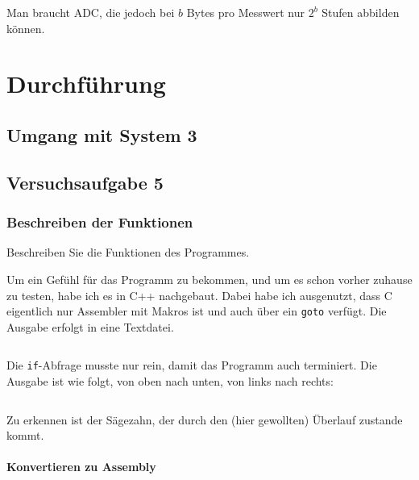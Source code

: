 Man braucht ADC, die jedoch bei $b$ Bytes pro Messwert nur $2^b$ Stufen
abbilden können.


\section{Durchführung}

\subsection{Umgang mit System 3}

\subsection{Versuchsaufgabe 5}

\subsubsection{Beschreiben der Funktionen}

\begin{problem}
	Beschreiben Sie die Funktionen des Programmes.
\end{problem}

Um ein Gefühl für das Programm zu bekommen, und um es schon vorher zuhause zu
testen, habe ich es in C++ nachgebaut. Dabei habe ich ausgenutzt, dass C
eigentlich nur Assembler mit Makros ist und auch über ein \texttt{goto}
verfügt. Die Ausgabe erfolgt in eine Textdatei.

\inputminted[fontsize=\small, linenos]{cpp}{../Prototypen/saegezahn.cpp}

Die \texttt{if}-Abfrage musste nur rein, damit das Programm auch terminiert.
Die Ausgabe ist wie folgt, von oben nach unten, von links nach rechts:

\begin{multicols}{9}
	\inputminted[fontsize=\footnotesize]{text}{saegezahn.txt}
\end{multicols}

Zu erkennen ist der Sägezahn, der durch den (hier gewollten) Überlauf zustande
kommt.

\paragraph{Konvertieren zu Assembly}

